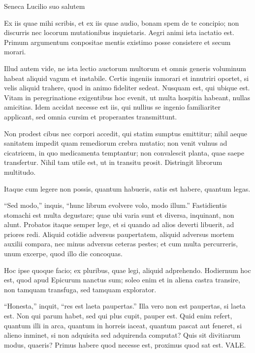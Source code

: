 {\large
\noindent Seneca Lucilio suo salutem

\medskip


\noindent Ex iis quae mihi scribis, et ex iis quae audio, bonam spem de te concipio; non discurris nec locorum mutationibus inquietaris. Aegri animi ista iactatio est. Primum argumentum conpositae mentis existimo posse consistere et secum morari.


Illud autem vide, ne ista lectio auctorum multorum et omnis generis voluminum habeat aliquid vagum et instabile. Certis ingeniis inmorari et innutriri oportet, si velis aliquid trahere, quod in animo fideliter sedeat. Nusquam est, qui ubique est. Vitam in peregrinatione exigentibus hoc evenit, ut multa hospitia habeant, nullas amicitias. Idem accidat necesse est iis, qui nullius se ingenio familiariter applicant, sed omnia cursim et properantes transmittunt.

Non prodest cibus nec corpori accedit, qui statim sumptus emittitur; nihil aeque sanitatem impedit quam remediorum crebra mutatio; non venit vulnus ad cicatricem, in quo medicamenta temptantur; non convalescit planta, quae saepe transfertur. Nihil tam utile est, ut in transitu prosit. Distringit librorum multitudo.

Itaque cum legere non possis, quantum habueris, satis est habere, quantum legas.

``Sed modo,'' inquis, ``hunc librum evolvere volo, modo illum.'' Fastidientis stomachi est multa degustare; quae ubi varia sunt et diversa, inquinant, non alunt. Probatos itaque semper lege, et si quando ad alios deverti libuerit, ad priores redi. Aliquid cotidie adversus paupertatem, aliquid adversus mortem auxilii compara, nec minus adversus ceteras pestes; et cum multa percurreris, unum excerpe, quod illo die concoquas.

Hoc ipse quoque facio; ex pluribus, quae legi, aliquid adprehendo. Hodiernum hoc est, quod apud Epicurum nanctus sum; soleo enim et in aliena castra transire, non tamquam transfuga, sed tamquam explorator.

``Honesta,'' inquit, ``res est laeta paupertas.'' Illa vero non est paupertas, si laeta est. Non qui parum habet, sed qui plus cupit, pauper est. Quid enim refert, quantum illi in arca, quantum in horreis iaceat, quantum pascat aut feneret, si alieno inminet, si non adquisita sed adquirenda computat? Quis sit divitiarum modus, quaeris? Primus habere quod necesse est, proximus quod sat est. VALE.

}





